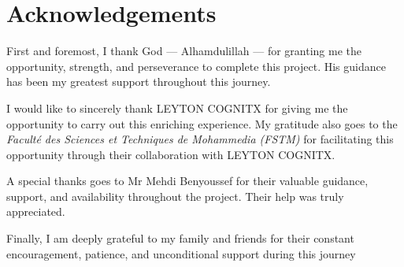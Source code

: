 \documentclass[12pt,a4paper,openany]{report}
\begin{document}


\chapter*{\centering Acknowledgements}
\begin{center}
First and foremost, I thank God — Alhamdulillah — for granting me the opportunity, strength, and perseverance to complete this project. His guidance has been my greatest support throughout this journey.

\vspace{1em}

I would like to sincerely thank LEYTON COGNITX for giving me the opportunity to carry out this enriching experience. My gratitude also goes to the \textit{Faculté des Sciences et Techniques de Mohammedia (FSTM)} for facilitating this opportunity through their collaboration with LEYTON COGNITX.

\vspace{1em}

A special thanks goes to Mr Mehdi Benyoussef for their valuable guidance, support, and availability throughout the project. Their help was truly appreciated.

\vspace{1em}

Finally, I am deeply grateful to my family and friends for their constant encouragement, patience, and unconditional support during this journey
 
\end{center}

\newpage





\end{document}
